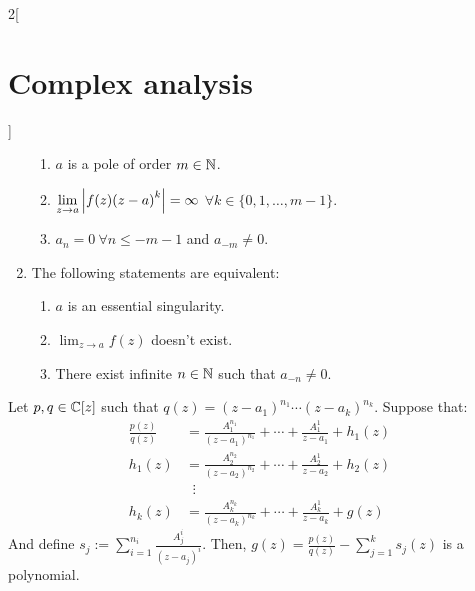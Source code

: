 \documentclass[../../../main.tex]{subfiles}
\begin{document}
\begin{multicols}{2}[\section{Complex analysis}]
\begin{corollary}
\begin{enumerate}
            \begin{enumerate}
              \item $a$ is a pole of order $m\in\mathbb{N}$.
              \item $\displaystyle\lim_{z\to a} \abs{f(z){(z-a)}^k}= \infty$ $\forall k\in\{0,1,\ldots,m-1\}$.
              \item $a_n=0\ \forall n\leq -m-1$ and $a_{-m}\ne 0$.
            \end{enumerate}
      \item  The following statements are equivalent:
            \begin{enumerate}
              \item $a$ is an essential singularity.
              \item $\displaystyle\lim_{z\to a} f(z)$ doesn't exist.
              \item There exist infinite $n\in\mathbb{N}$ such that $a_{-n}\ne 0$.
            \end{enumerate}
    \end{enumerate}
  \end{corollary}
  \begin{corollary}
    Let $p,q\in\mathbb{C}[z]$ such that $q(z)={(z-a_1)}^{n_1}\cdots{(z-a_k)}^{n_k}$. Suppose that:
    \begin{align*}
      \frac{p(z)}{q(z)} & =\frac{A_1^{n_1}}{{(z-a_1)}^{n_1}}+\cdots+\frac{A_1^{1}}{z-a_1}+h_1(z) \\
      h_1(z)            & =\frac{A_2^{n_2}}{{(z-a_2)}^{n_2}}+\cdots+\frac{A_2^{1}}{z-a_2}+h_2(z) \\
                        & \;\;\vdots                                                             \\
      h_k(z)            & =\frac{A_k^{n_k}}{{(z-a_k)}^{n_k}}+\cdots+\frac{A_k^{1}}{z-a_k}+g(z)
    \end{align*}
    And define $s_j:=\sum_{i= 1}^{n_i}\frac{A_j^i}{{(z-a_j)}^i}$.
    Then, $g(z)=\frac{p(z)}{q(z)}-\sum_{j=1}^k s_j(z)$ is a polynomial.
  \end{corollary}

\end{multicols}
\end{document}
